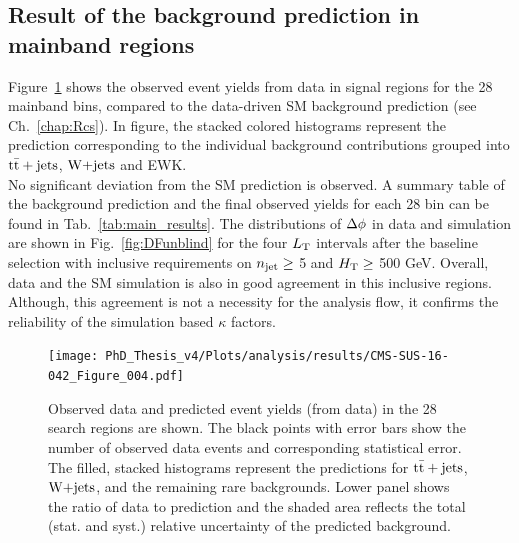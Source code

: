 \subsection{Result of the background prediction in mainband regions}
\label{sec:Resmain}
Figure~\ref{fig:mainRes} shows the observed event yields from data in signal regions for the 28 mainband bins, compared to the data-driven SM background prediction (see Ch.~\ref{chap:Rcs}). 
In figure, the stacked colored histograms represent the prediction corresponding to the individual background contributions grouped into ${\rm t\bar{t}+jets}$, $\textrm{W+jets}$ and EWK. \\
No significant deviation from the SM prediction is observed. A summary table of the background prediction and the final observed yields for each 28 bin can be found in Tab.~\ref{tab:main_results}.
The distributions of $\Delta \phi$ in data and simulation are shown in Fig.~\ref{fig:DFunblind} for the four $L_{\rm T}$ intervals after the baseline selection with inclusive requirements on $n_{\rm jet}\geq$ 5 and $H_{\rm T}\geq$ 500 GeV. Overall, data and the SM simulation is also in good agreement in this inclusive regions. Although, this agreement is not a necessity for the analysis flow, it confirms the reliability of the simulation based $\kappa$ factors.

\begin{figure}[!htb]
\begin{center}
    \texttt{[image: PhD\_Thesis\_v4/Plots/analysis/results/CMS-SUS-16-042\_Figure\_004.pdf]}
    \caption[The results of main background estimation.]{Observed data and predicted event yields (from data) in the 28 search regions are shown. The black points with error bars show the number of observed data events and corresponding statistical error. The filled, stacked histograms represent the predictions for ${\rm t\bar{t}+jets}$, $\textrm{W+jets}$, and the remaining rare backgrounds. Lower panel shows the ratio of data to prediction and the shaded area reflects the total (stat. and syst.) relative uncertainty of the predicted background. 
    }
    \label{fig:mainRes}
\end{center}
\end{figure}
